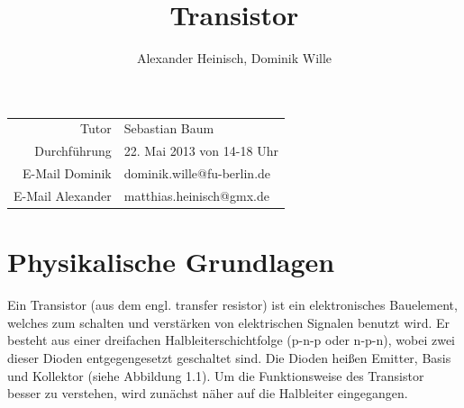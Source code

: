 \documentclass{article}
\title{Transistor}
\author{Alexander Heinisch, Dominik Wille}
\begin{document}
\maketitle
\vspace{13cm}
\noindent
\begin{center}
\begin{tabular}{r l}
Tutor & Sebastian Baum  \\
Durchführung & 22. Mai 2013 von 14-18 Uhr \\

E-Mail Dominik & dominik.wille@fu-berlin.de \\
E-Mail Alexander & matthias.heinisch@gmx.de \\
\end{tabular}
\end{center}

\newpage
\tableofcontents
\newpage

\section{Physikalische Grundlagen}
Ein Transistor (aus dem engl. transfer resistor) ist ein elektronisches Bauelement, welches zum schalten und verstärken von elektrischen Signalen benutzt wird. Er besteht aus einer dreifachen Halbleiterschichtfolge (p-n-p oder n-p-n), wobei zwei dieser Dioden entgegengesetzt geschaltet sind. Die Dioden heißen Emitter, Basis und Kollektor (siehe Abbildung 1.1). Um die Funktionsweise des Transistor besser zu verstehen, wird zunächst näher auf die Halbleiter eingegangen.
\end{document}
